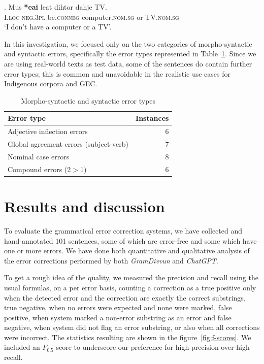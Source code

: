\documentclass[free]{flammie}
\begin{document}
\begin{tcolorbox}[colframe=corpusframe, colback=corpusback, arc=2mm]
\exg. Mus \textbf{*eai} leat dihtor dahje TV.\label{TV}\\
I\textsc{.loc} \textsc{neg.3pl} be\textsc{.conneg} computer\textsc{.nom.sg} or
TV\textsc{.nom.sg}\\
`I don't have a computer or a TV'.

\end{tcolorbox}

In this investigation, we focused only on the two categories of morpho-syntactic
and syntactic errors, specifically the error types represented in
Table~\ref{errortypes}. Since we are using real-world texts as test data, some
of the sentences do contain further error types; this is common and unavoidable
in the realistic use cases for Indigenous corpora and GEC.\


\begin{table}
    \small
    \centering
    \begin{tabular}{lr}
        \toprule
        Error type &  Instances \\
        \midrule
        Adjective inflection errors & 6 \\
        Global agreement errors (subject-verb) & 7 \\
        Nominal case errors & 8 \\
        Compound errors (2$>$1) & 6 \\
        \bottomrule
    \end{tabular}
    \caption{Morpho-syntactic and syntactic error types\label{errortypes}}
\end{table}



\section{Results and discussion}

To evaluate the grammatical error correction systems, we have collected and
hand-annotated 101 sentences, some of which are error-free and
some which have one or more errors. We have done both quantitative and
qualitative analysis of the error corrections performed by both
\textit{GramDivvun} and \textit{ChatGPT}.

To get a rough idea of the quality, we measured the precision and recall using
the usual formulas, on a per error basis, counting a correction as a true
positive only when the detected error and the correction are exactly the correct
substrings, true negative, when no errors were expected and none were marked,
false positive, when system marked a non-error substring as an error and false
negative, when system did not flag an error substring, or also when all
corrections were incorrect. The statistics resulting are shown in the
figure~\ref{fig:f-scores}. We included an $F_{0.5}$ score to underscore our
preference for high precision over high recall.
\end{document}
